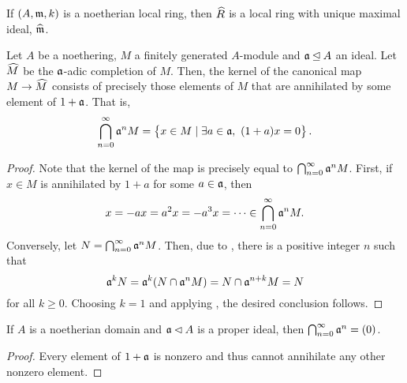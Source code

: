 \begin{corollary}
    If $(A,\mathfrak m,k)$ is a noetherian local ring, then $\widehat{R}$ is a local ring with unique maximal ideal, $\widehat{\mathfrak m}$.
\end{corollary}

\begin{theorem}
    Let $A$ be a noethering, $M$ a finitely generated $A$-module and $\mathfrak a\unlhd A$ an ideal. Let $\widehat{M}$ be the $\mathfrak a$-adic completion of $M$. Then, the kernel of the canonical map $M\to\widehat{M}$ consists of precisely those elements of $M$ that are annihilated by some element of $1 + \mathfrak a$. That is, 
    \begin{equation*}
        \bigcap_{n = 0}^\infty\mathfrak a^n M = \left\{x\in M\mid\exists a\in\mathfrak a,~(1 + a)x = 0\right\}.
    \end{equation*}
\end{theorem}
\begin{proof}
    Note that the kernel of the map is precisely equal to $\bigcap_{n = 0}^\infty\mathfrak a^n M$. First, if $x\in M$ is annihilated by $1 + a$ for some $a\in\mathfrak a$, then 
    \begin{equation*}
        x = -ax = a^2x = -a^3x = \cdots\in\bigcap_{n = 0}^\infty\mathfrak a^n M.
    \end{equation*}
    Conversely, let $N = \bigcap_{n = 0}^\infty\mathfrak a^n M$. Then, due to , there is a positive integer $n$ such that 
    \begin{equation*}
        \mathfrak a^k N = \mathfrak a^{k}(N\cap\mathfrak a^n M) = N\cap\mathfrak a^{n + k}M = N
    \end{equation*}
    for all $k\ge 0$. Choosing $k = 1$ and applying , the desired conclusion follows.
\end{proof}

\begin{corollary}
    If $A$ is a noetherian domain and $\mathfrak a\lhd A$ is a proper ideal, then $\bigcap_{n = 0}^\infty\mathfrak a^n = (0)$.
\end{corollary}
\begin{proof}
    Every element of $1 + \mathfrak a$ is nonzero and thus cannot annihilate any other nonzero element.
\end{proof}

